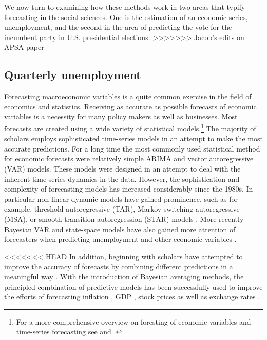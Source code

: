 \documentclass[12pt,fullpage,endnotes]{article}
\begin{document}
We now turn to examining how these methods work in two areas that
typify forecasting in the social sciences. One is the estimation of an
economic series, unemployment, and the second in the area of
predicting the vote for the incumbent party in U.S. presidential
elections.
>>>>>>> Jacob's edits on APSA paper

\subsection{Quarterly unemployment}\label{econ}
Forecasting macroeconomic variables is a quite common exercise in the field of economics and statistics. Receiving as accurate as possible forecasts of economic variables is a necessity for many policy makers as well as businesses. Most forecasts are created using a wide variety of statistical models.\footnote{For a more comprehensive overview on foresting of economic variables and time-series forecasting see \citet{Elliott:Timmermann:2008} and \citet{Goijer:Hyndman:2006}.} 
The majority of scholars employs sophisticated time-series models in an attempt to make the most accurate predictions. For a long time the most commonly used statistical method for economic forecasts were relatively simple ARIMA and vector autoregressive (VAR) models. These models were designed in an attempt to deal with the inherent time-series dynamics in the data. However, the sophistication and complexity of forecasting models has increased considerably since the 1980s. In particular non-linear dynamic models have gained prominence, such as for example, threshold autoregressive (TAR), Markov switching autoregressive (MSA), or smooth transition autoregression (STAR) models \citep{Elliott:Timmermann:2008,Montgomery:etal:1998}. More recently Bayesian VAR and state-space models have  also gained more attention of forecasters when predicting unemployment and other economic variables \citep{Goijer:Hyndman:2006,Elliott:Timmermann:2008}. 

<<<<<<< HEAD
In addition, beginning with \citet{Bates:1969} scholars have attempted to improve the accuracy of forecasts by combining different predictions in a meaningful way \citep{Palm:Zellner:1992,Elliott:Timmermann:2008}.  With the introduction of Bayesian averaging methods, the principled combination of predictive models has been successfully used to improve the efforts of forecasting          inflation \citep{Koop:2010,Wright:2009}, GDP \citep{Billio:2010}, stock prices \citep{Billio:2011} as well as exchange rates \citep{Wright:2008}.  
\end{document}
